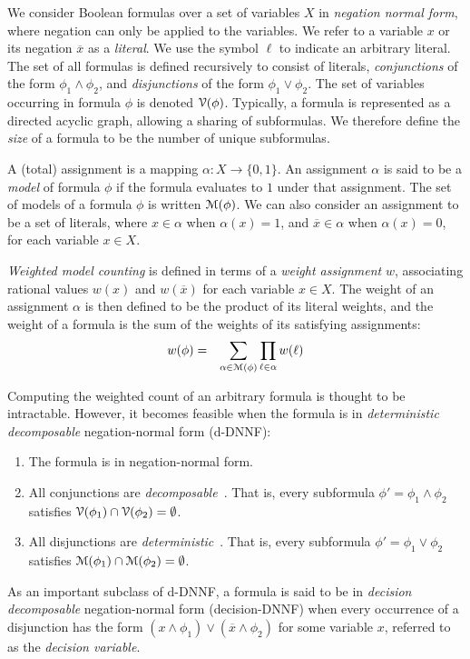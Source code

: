 \documentclass[letterpaper,USenglish,cleveref, autoref, thm-restate]{lipics-v2021}
\newcommand{\obar}[1]{\overline{#1}}
\newcommand{\lit}{\ell}
\newcommand{\varset}{X}
\newcommand{\dependencyset}{{\cal V}}
\newcommand{\assign}{\alpha}
\newcommand{\modelset}{{\cal M}}
\begin{document}
We consider Boolean formulas over a set of variables $\varset$ in
\emph{negation normal form}, where negation can only be applied to the
variables.  We refer to a variable $x$ or its negation $\obar{x}$ as a
\emph{literal}.  We use the symbol $\lit$ to indicate an arbitrary
literal.  The set of all formulas is defined recursively to consist of
literals, \emph{conjunctions} of the form $\phi_1 \land \phi_2$, and
\emph{disjunctions} of the form $\phi_1 \lor \phi_2$.  The set of
variables occurring in formula $\phi$ is denoted
$\dependencyset(\phi)$.  Typically, a formula is represented as a
directed acyclic graph, allowing a sharing of subformulas.  We
therefore define the \emph{size} of a formula to be the number of
unique subformulas.

A (total) assignment is a mapping $\assign \colon \varset \rightarrow
\{0, 1\}$.  An assignment $\assign$ is said to be a \emph{model} of
formula $\phi$ if the formula evaluates to $1$ under that assignment.
The set of models of a formula $\phi$ is written $\modelset(\phi)$.
We can also consider an assignment to be a set of literals, where $x \in \assign$
when $\assign(x) = 1$, and $\obar{x} \in \assign$ when
$\assign(x) = 0$, for each variable $x \in \varset$.

\emph{Weighted model counting} is defined in terms of a \emph{weight
  assignment} $w$, associating rational values $w(x)$ and
$w(\obar{x})$ for each variable $x \in \varset$.
The weight of an
assignment $\assign$ is then defined to be the product of its literal weights, and the weight
of a formula is the sum of the weights of its satisfying assignments:
\begin{eqnarray}
  w(\phi) & = & \sum_{\assign \in \modelset(\phi)} \prod_{\lit \in \assign} w(\lit) \label{eqn:wmc}
\end{eqnarray}

Computing the weighted count of an arbitrary formula is thought to be intractable.  However, it becomes
feasible when the formula is in \emph{deterministic decomposable} negation-normal form (d-DNNF):
\begin{enumerate}
\item The formula is in negation-normal form.  
\item All conjunctions are \emph{decomposable}~\cite{darwiche:jacm:2001,darwiche:jair:2002}.  That is, every subformula $\phi' = \phi_1 \land \phi_2$
  satisfies $\dependencyset(\phi_1) \cap \dependencyset(\phi_2) = \emptyset$.
\item All disjunctions are \emph{deterministic}~\cite{darwiche:jancl:2001,darwiche:jair:2002}.  That is, every subformula $\phi' = \phi_1 \lor \phi_2$ satisfies
  $\modelset(\phi_1) \cap \modelset(\phi_2) = \emptyset$.
\end{enumerate}
As an important subclass of d-DNNF, a formula is said to be in 
\emph{decision decomposable} negation-normal form (decision-DNNF) when every occurrence of a disjunction has the form 
$(x \land \phi_1) \lor (\obar{x} \land \phi_2)$ for some variable $x$, referred to as the \emph{decision variable}.
\end{document}
